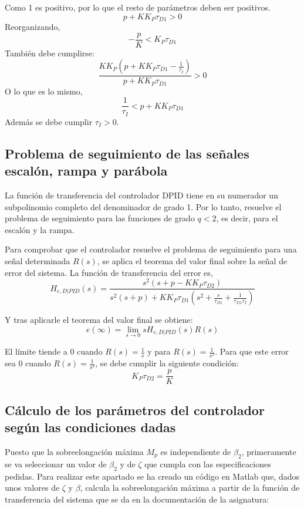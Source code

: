 \documentclass[a4paper]{article}
\begin{document}
Como 1 es positivo, por lo que el resto de parámetros deben ser positivos.
\begin{equation}
	p+K K_P \tau_{D1}>0
\end{equation}
Reorganizando, 
\begin{equation}
	-\frac{p}{K}<K_P \tau_{D1}
	\label{eq:2}
\end{equation}
También debe cumplirse:
\begin{equation}
	\frac{K K_P (p+K K_P \tau_{D1} -\frac{1}{\tau_I})}{p+K K_P \tau_{D1}} > 0
\end{equation}
O lo que es lo mismo,
\begin{equation}
	\frac{1}{\tau_I} < p+K K_P \tau_{D1}
	\label{eq:3}
\end{equation}
Además se debe cumplir $\tau_I > 0$.

\subsection{Problema de seguimiento de las señales escalón, rampa y parábola}
La función de transferencia del controlador D\textbar PID tiene en su numerador un subpolinomio completo del denominador de grado 1. Por lo tanto, resuelve el problema de seguimiento para las funciones de grado $q<2$, es decir, para el escalón y la rampa.

Para comprobar que el controlador resuelve el problema de seguimiento para una señal determinada $R(s)$, se aplica el teorema del valor final sobre la señal de error del sistema.
La función de transferencia del error es,
\begin{equation}
	H_{e, D|PID}(s)=\frac{s^2(s+p-K K_P \tau_{D2})}{s^2(s+p)+K K_P \tau_{D1}(s^2+\frac{s}{\tau_{D1}}+\frac{1}{\tau_{D1} \tau_I})}
\end{equation}

Y tras aplicarle el teorema del valor final se obtiene:
\begin{equation}
	e(\infty)=\lim_{s \rightarrow 0}
	s H_{e, D|PID}(s) R(s)
\end{equation}

El límite tiende a 0 cuando $R(s)=\frac{1}{s}$ y para $R(s)=\frac{1}{s^2}$. Para que este error sea $0$ cuando $R(s)=\frac{1}{s^3}$, se debe cumplir la siguiente condición:
\begin{equation}
K_P \tau_{D2} = \frac{p}{K}
\end{equation}

\subsection{Cálculo de los parámetros del controlador según las condiciones dadas}
Puesto que la sobreelongación máxima $M_p$ es independiente de $\beta_2$, primeramente se va seleccionar un valor de $\beta_2$ y de $\zeta$ que cumpla con las especificaciones pedidas.
Para realizar este apartado se ha creado un código en Matlab que, dados unos valores de $\zeta$ y $\beta$, calcula la sobreelongación máxima a partir de la función de transferencia del sistema que se da en la documentación de la asignatura:
\end{document}
